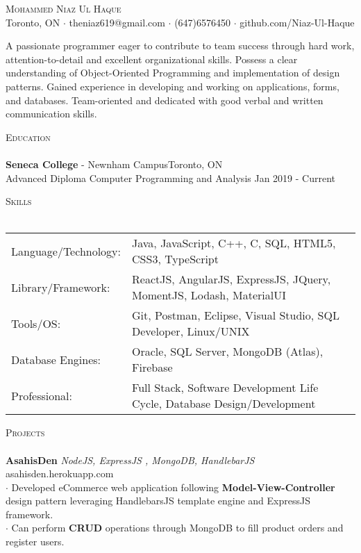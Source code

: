 \documentclass[a4paper]{article}
\newcommand{\lineunder} {
    \vspace*{-8pt} \\
    \hspace*{-18pt} \hrulefill \\
}
\newcommand{\header} [1] {
    {\hspace*{-18pt}\vspace*{6pt} \textsc{#1}}
    \vspace*{-6pt} \lineunder
}
\begin{document}
\vspace*{-40pt}

    

\vspace*{-10pt}
\begin{center}
	{\Huge \scshape {Mohammed Niaz Ul Haque}}\\
	Toronto, ON $\cdot$ theniaz619@gmail.com $\cdot$ (647)6576450 $\cdot$ github.com/Niaz-Ul-Haque\\
\end{center}

\text A passionate programmer eager to contribute to team success through hard work, attention-to-detail and excellent organizational skills. Possess a clear understanding of Object-Oriented Programming and implementation of design patterns. Gained experience in developing and working on applications, forms, and databases. Team-oriented and dedicated with good verbal and written communication skills.\\
\vspace{2mm}
\header{Education}
\textbf{Seneca College} - Newnham Campus\hfill Toronto, ON\\
{Advanced Diploma} Computer Programming and Analysis \hfill Jan 2019 - Current\\
\vspace{2mm}
\header{Skills}\vspace{1mm}
\begin{tabular}{ l l  }
	Language/Technology: & Java, JavaScript, C++, C, SQL, HTML5, CSS3, TypeScript  \\
	Library/Framework:   & ReactJS, AngularJS, ExpressJS, JQuery, MomentJS, Lodash, MaterialUI \\
	Tools/OS:               & Git, Postman, Eclipse, Visual Studio, SQL Developer, Linux/UNIX  \\
	Database Engines:      & Oracle, SQL Server, MongoDB (Atlas), Firebase                            \\
	Professional:      & Full Stack, Software Development Life Cycle, Database Design/Development 
                            \\
\end{tabular}
\vspace{0.3mm}

\header{Projects}\vspace{0.3mm}
{\textbf{AsahisDen}} {\sl NodeJS, ExpressJS , MongoDB, HandlebarJS} \hfill asahisden.herokuapp.com\\
$\cdot$ Developed eCommerce web application following {\textbf{Model-View-Controller}} design pattern leveraging HandlebarsJS template engine and ExpressJS framework.\\
$\cdot$ Can perform {\textbf{CRUD}} operations through MongoDB to fill product orders and register users.\\
\vspace*{2mm}
\end{document}
